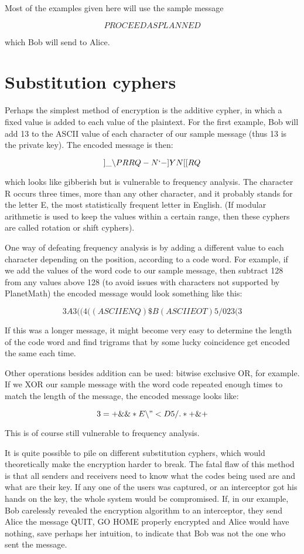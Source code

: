\documentclass[12pt]{article}
\begin{document}
Most of the examples given here will use the sample message

$$PROCEED AS PLANNED$$

which Bob will send to Alice.

\section{Substitution cyphers}

Perhaps the simplest method of encryption is the additive cypher, in which a fixed value is added to each value of the plaintext. For the first example, Bob will add 13 to the ASCII value of each character of our sample message (thus 13 is the private key). The encoded message is then:

$$]\_{\backslash}PRRQ-N`-]YN[[RQ$$

which looks like gibberish but is vulnerable to frequency analysis. The character R occurs three times, more than any other character, and it probably stands for the letter E, the most statistically frequent letter in English. (If modular arithmetic is used to keep the values within a certain range, then these cyphers are called rotation or shift cyphers).

One way of defeating frequency analysis is by adding a different value to each character depending on the position, according to a code word. For example, if we add the values of the word code to our sample message, then subtract 128 from any values above 128 (to avoid issues with characters not supported by PlanetMath) the encoded message would look something like this:

$$3A3((4((ASCII ENQ)\$B(ASCII EOT)5/023(3$$

If this was a longer message, it might become very easy to determine the length of the code word and find trigrams that by some lucky coincidence get encoded the same each time.

Other operations besides addition can be used: bitwise exclusive OR, for example. If we XOR our sample message with the word code repeated enough times to match the length of the message, the encoded message looks like:

$$3=+\&\&* E{\backslash}"<D5/.*+\&+$$

This is of course still vulnerable to frequency analysis.

It is quite possible to pile on different substitution cyphers, which would theoretically make the encryption harder to break. The fatal flaw of this method is that all senders and receivers need to know what the codes being used are and what are their key. If any one of the users was captured, or an interceptor got his hands on the key, the whole system would be compromised. If, in our example, Bob carelessly revealed the encryption algorithm to an interceptor, they send Alice the message QUIT, GO HOME properly encrypted and Alice would have nothing, save perhaps her intuition, to indicate that Bob was not the one who sent the message.
\end{document}
